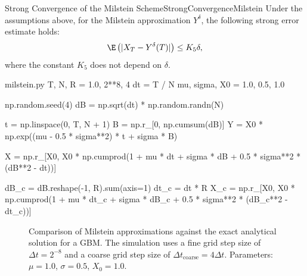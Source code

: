 \begin{thm}{Strong Convergence of the Milstein Scheme}{StrongConvergenceMilstein}
    Under the assumptions above, for the Milstein approximation \(Y^\delta\), the following strong error estimate holds:
    \begin{equation}
        \E \left(|X_T - Y^\delta(T)|\right) \leq K_5 \delta, \label{eq:MilsteinConvergenceBound}
    \end{equation}
    where the constant \(K_5\) does not depend on \(\delta\).
\end{thm}

\begin{Pcode}{milstein.py}
    T, N, R = 1.0, 2**8, 4
    dt = T / N
    mu, sigma, X0 = 1.0, 0.5, 1.0

    np.random.seed(4)
    dB = np.sqrt(dt) * np.random.randn(N)

    t = np.linspace(0, T, N + 1)
    B = np.r_[0, np.cumsum(dB)]
    Y = X0 * np.exp((mu - 0.5 * sigma**2) * t + sigma * B)

    X = np.r_[X0, X0 * np.cumprod(1 + mu * dt + sigma * dB + 0.5 * sigma**2 * (dB**2 - dt))]

    dB_c = dB.reshape(-1, R).sum(axis=1)
    dt_c = dt * R
    X_c = np.r_[X0, X0 * np.cumprod(1 + mu * dt_c + sigma * dB_c + 0.5 * sigma**2 * (dB_c**2 - dt_c))]
\end{Pcode}

\begin{figure}[H]
    \centering
    
    \caption{Comparison of Milstein approximations against the exact analytical solution for a GBM. The simulation uses a fine grid step size of \(\Delta t = 2^{-8}\) and a coarse grid step size of \(\Delta t_{\text{coarse}} = 4\Delta t\). Parameters: \(\mu=1.0\), \(\sigma=0.5\), \(X_0=1.0\).}
    \label{fig:milsteinCoarseFineComparison}
\end{figure}